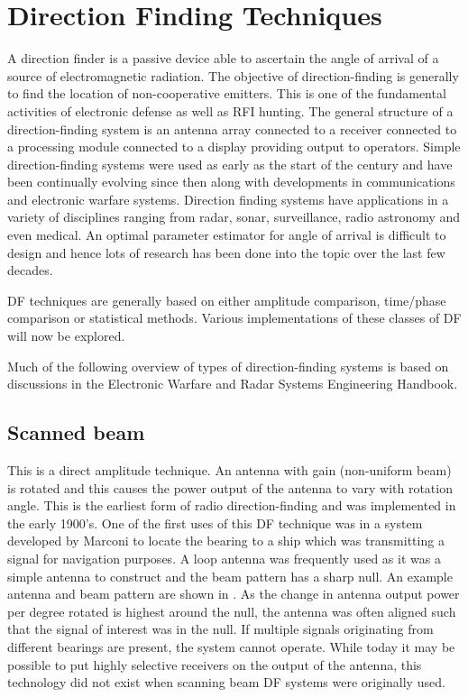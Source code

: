 \section{Direction Finding Techniques}
A direction finder is a passive device able to ascertain the angle of arrival of a source of electromagnetic radiation.
The objective of direction-finding is generally to find the location of non-cooperative emitters\cite{poisel2012electronic}.
This is one of the fundamental activities of electronic defense as well as RFI hunting.
The general structure of a direction-finding system is an antenna array connected to a receiver connected to a processing module connected to a display providing output to operators.
Simple direction-finding systems were used as early as the start of the  century and have been continually evolving since then along with developments in communications and electronic warfare systems.
Direction finding systems have applications in a variety of disciplines ranging from radar, sonar, surveillance, radio astronomy and even medical. An optimal parameter estimator for angle of arrival is difficult to design and hence lots of research has been done into the topic over the last few decades\cite{van2004detection}.

DF techniques are generally based on either amplitude comparison, time/phase comparison or statistical methods\cite{tuncer2009classical}. 
Various implementations of these classes of DF will now be explored.

Much of the following overview of types of direction-finding systems is based on discussions in the Electronic Warfare and Radar Systems Engineering Handbook\cite{center2012electronic}.

\subsection{Scanned beam}
This is a direct amplitude technique. An antenna with gain (non-uniform beam) is rotated and this causes the power output of the antenna to vary with rotation angle. This is the earliest form of radio direction-finding and was implemented in the early 1900's. 
One of the first uses of this DF technique was in a system developed by Marconi to locate the bearing to a ship which was transmitting a signal for navigation purposes\cite{jenkins1991smallaperture}. A loop antenna was frequently used as it was a simple antenna to construct and the beam pattern has a sharp null. 
An example antenna and beam pattern are shown in . As the change in antenna output power per degree rotated is highest around the null, the antenna was often aligned such that the signal of interest was in the null. 
If multiple signals originating from different bearings are present, the system cannot operate. 
While today it may be possible to put highly selective receivers on the output of the antenna, this technology did not exist when scanning beam DF systems were originally used.

